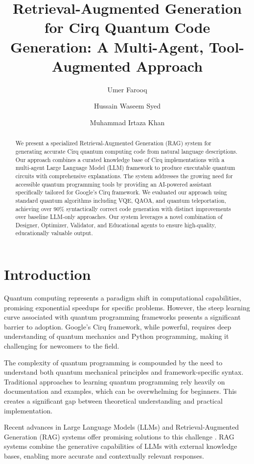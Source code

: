 \documentclass[runningheads]{llncs}
\title{Retrieval-Augmented Generation for Cirq Quantum Code Generation: A Multi-Agent, Tool-Augmented Approach}
\author{Umer Farooq \and Hussain Waseem Syed \and Muhammad Irtaza Khan}
\institute{FAST NUCES Islamabad, Department of Computer Science\\
\email{i220891@nu.edu.pk, i220893@nu.edu.pk, i220911@nu.edu.pk}}
\begin{document}
\maketitle

\begin{abstract}
We present a specialized Retrieval-Augmented Generation (RAG) system for generating accurate Cirq quantum computing code from natural language descriptions. Our approach combines a curated knowledge base of Cirq implementations with a multi-agent Large Language Model (LLM) framework to produce executable quantum circuits with comprehensive explanations. The system addresses the growing need for accessible quantum programming tools by providing an AI-powered assistant specifically tailored for Google's Cirq framework. We evaluated our approach using standard quantum algorithms including VQE, QAOA, and quantum teleportation, achieving over 90\% syntactically correct code generation with distinct improvements over baseline LLM-only approaches. Our system leverages a novel combination of Designer, Optimizer, Validator, and Educational agents to ensure high-quality, educationally valuable output.
\end{abstract}

\section{Introduction}

Quantum computing represents a paradigm shift in computational capabilities, promising exponential speedups for specific problems. However, the steep learning curve associated with quantum programming frameworks presents a significant barrier to adoption. Google's Cirq framework, while powerful, requires deep understanding of quantum mechanics and Python programming, making it challenging for newcomers to the field.

The complexity of quantum programming is compounded by the need to understand both quantum mechanical principles and framework-specific syntax. Traditional approaches to learning quantum programming rely heavily on documentation and examples, which can be overwhelming for beginners. This creates a significant gap between theoretical understanding and practical implementation.

Recent advances in Large Language Models (LLMs) and Retrieval-Augmented Generation (RAG) systems offer promising solutions to this challenge \cite{siavash2025modeldrivenquantumcodegeneration}. RAG systems combine the generative capabilities of LLMs with external knowledge bases, enabling more accurate and contextually relevant responses. 
\end{document}
